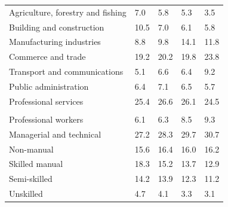 \documentclass{article}
\begin{document}
\begin{table}[h]
\begin{tabular}{KTTTT}
    \hline
Agriculture, forestry and fishing  & 7.0& 5.8& 5.3& 3.5\\
Building and construction & 10.5&  7.0&  6.1&  5.8\\
Manufacturing industries &  8.8&  9.8& 14.1& 11.8\\
Commerce and trade  & 19.2& 20.2& 19.8& 23.8\\
Transport and communications  & 5.1& 6.6& 6.4& 9.2\\
Public administration & 6.4& 7.1& 6.5& 5.7\\
Professional services & 25.4& 26.6& 26.1& 24.5\\
\hline
    \\ 
    \hline
Professional workers  & 6.1& 6.3 & 8.5& 9.3\\
Managerial and technical & 27.2& 28.3& 29.7& 30.7\\
Non-manual & 15.6& 16.4& 16.0& 16.2\\
Skilled manual & 18.3& 15.2& 13.7& 12.9\\
Semi-skilled & 14.2& 13.9& 12.3& 11.2\\
Unskilled  & 4.7& 4.1& 3.3& 3.1\\
\end{tabular}
\end{table}
\pagebreak
\end{document}
